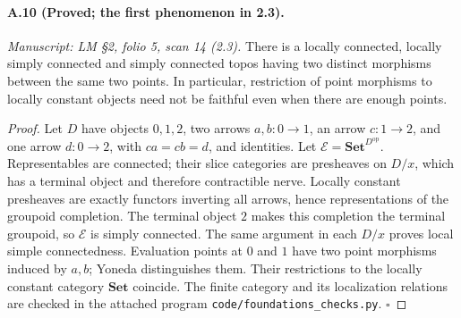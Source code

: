 \paragraph{A.10 (Proved; the first phenomenon in 2.3).}
\textit{Manuscript: LM \S2, folio 5, scan 14 (2.3).}
There is a locally connected, locally simply connected and simply connected topos having two distinct morphisms between the same two points. In particular, restriction of point morphisms to locally constant objects need not be faithful even when there are enough points.
\begin{proof}
Let $D$ have objects $0,1,2$, two arrows $a,b:0\to1$, an arrow $c:1\to2$, and one arrow $d:0\to2$, with $ca=cb=d$, and identities. Let $\mathcal E=\mathbf{Set}^{D^{\mathrm{op}}}$. Representables are connected; their slice categories are presheaves on $D/x$, which has a terminal object and therefore contractible nerve. Locally constant presheaves are exactly functors inverting all arrows, hence representations of the groupoid completion. The terminal object $2$ makes this completion the terminal groupoid, so $\mathcal E$ is simply connected. The same argument in each $D/x$ proves local simple connectedness. Evaluation points at $0$ and $1$ have two point morphisms induced by $a,b$; Yoneda distinguishes them. Their restrictions to the locally constant category $\mathbf{Set}$ coincide. The finite category and its localization relations are checked in the attached program \texttt{code/foundations\_checks.py}. \hfill$\square$
\end{proof}

